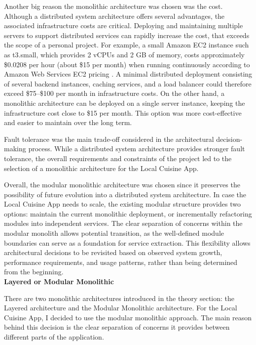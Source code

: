 Another big reason the monolithic architecture was chosen was the cost. 
Although a distributed system architecture offers several advantages,
the associated infrastructure costs are critical. Deploying and maintaining 
multiple servers to support distributed services can rapidly increase the cost,
that exceeds the scope of a personal project.
For example, a small Amazon EC2 instance such as t3.small, which provides 
2 vCPUs and 2 GB of memory, costs approximately \$0.0208 per hour 
(about \$15 per month) when running continuously according to Amazon Web 
Services EC2 pricing \cite{Amazon_Web_Services}. 
A minimal distributed deployment consisting of several backend instances, 
caching services, and a load balancer could therefore exceed 
\$75--\$100 per month in infrastructure costs.
On the other hand, a monolithic architecture can be deployed on a single 
server instance, keeping the infrastructure cost close to \$15 per month.
This option was more cost-effective and easier to maintain over the long term.

Fault tolerance was the main trade-off considered in the architectural decision-making process.
While a distributed system architecture provides stronger fault tolerance,
the overall requirements and constraints of the project led to the selection of a monolithic architecture for the Local Cuisine App. 

Overall, the modular monolithic architecture was chosen since it preserves the possibility of future evolution into a distributed system architecture.
In case the Local Cuisine App needs to scale, the existing modular structure provides two options: maintain the current monolithic deployment, 
or incrementally refactoring modules into independent services.
The clear separation of concerns within the modular monolith allows potential transition, as the well-defined module boundaries can serve as a foundation for service extraction.
This flexibility allows architectural decisions to be revisited based on observed system growth, performance requirements, and usage patterns, rather than being determined from the beginning. \\

\noindent \textbf{Layered or Modular Monolithic}

There are two monolithic architectures introduced in the theory section: the Layered architecture and the Modular Monolithic architecture.
For the Local Cuisine App, I decided to use the modular monolithic approach.
The main reason behind this decision is the clear separation of concerns it provides between different parts of the application.

